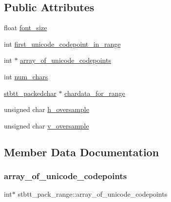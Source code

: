 \subsection*{Public Attributes}
\begin{DoxyCompactItemize}
\item 
float \mbox{\hyperlink{structstbtt__pack__range_a296916dc971e5e7627822fe98dc42828}{font\+\_\+size}}
\item 
int \mbox{\hyperlink{structstbtt__pack__range_a3b414cbee1e164c29dd138e0ae3d5759}{first\+\_\+unicode\+\_\+codepoint\+\_\+in\+\_\+range}}
\item 
int $\ast$ \mbox{\hyperlink{structstbtt__pack__range_a1567aa5455e1251529a91b46261368cf}{array\+\_\+of\+\_\+unicode\+\_\+codepoints}}
\item 
int \mbox{\hyperlink{structstbtt__pack__range_a046d65b6ffb65fb998d471ba098e2e23}{num\+\_\+chars}}
\item 
\mbox{\hyperlink{structstbtt__packedchar}{stbtt\+\_\+packedchar}} $\ast$ \mbox{\hyperlink{structstbtt__pack__range_aa8f7ddd637ed341ea39b08466fab9284}{chardata\+\_\+for\+\_\+range}}
\item 
unsigned char \mbox{\hyperlink{structstbtt__pack__range_a7a642139ce446c58fde5c48553bcf008}{h\+\_\+oversample}}
\item 
unsigned char \mbox{\hyperlink{structstbtt__pack__range_a6288f14006e257544db3d015c32b4113}{v\+\_\+oversample}}
\end{DoxyCompactItemize}


\subsection{Member Data Documentation}
\mbox{\label{structstbtt__pack__range_a1567aa5455e1251529a91b46261368cf}} 
\subsubsection{\texorpdfstring{array\+\_\+of\+\_\+unicode\+\_\+codepoints}{array\_of\_unicode\_codepoints}}
{\footnotesize\ttfamily int$\ast$ stbtt\+\_\+pack\+\_\+range\+::array\+\_\+of\+\_\+unicode\+\_\+codepoints}

